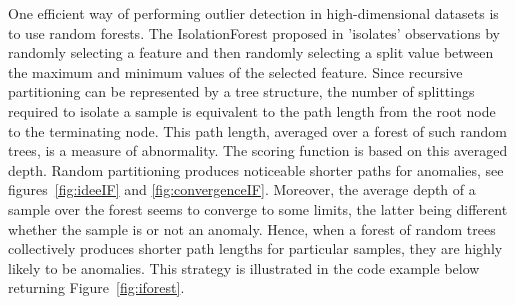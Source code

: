One efficient way of performing outlier detection in high-dimensional datasets
is to use random forests.
%
The IsolationForest proposed in \cite{Liu2008} 'isolates' observations by randomly selecting a feature and then randomly selecting a split value between the maximum and minimum values of the selected feature.
%
Since recursive partitioning can be represented by a tree structure, the
number of splittings required to isolate a sample is equivalent to the path
length from the root node to the terminating node.
%
This path length, averaged over a forest of such random trees, is a measure
of abnormality. The scoring function is based on this averaged depth.
%
Random partitioning produces noticeable shorter paths for anomalies, see figures~\ref{fig:ideeIF} and \ref{fig:convergenceIF}. Moreover, the average depth of a sample over the forest seems to converge to some limits, the latter being different whether the sample is or not an anomaly.
Hence, when a forest of random trees collectively produces shorter path lengths
for particular samples, they are highly likely to be anomalies.
%
This strategy is illustrated in the code example below returning Figure~\ref{fig:iforest}.


